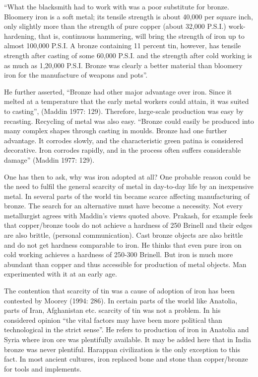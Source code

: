 {\footnotesize “What the blacksmith had to work with was a poor substitute for bronze. Bloomery iron is a soft metal; its tensile strength is about 40,000 per square inch, only slightly more than the strength of pure copper (about 32,000 P.S.I.) work-hardening, that is, continuous hammering, will bring the strength of iron up to almost 100,000 P.S.I. A bronze containing 11 percent tin, however, has tensile strength after casting of some 60,000 P.S.I. and the strength after cold working is as much as 1,20,000 P.S.I. Bronze was clearly a better material than bloomery iron for the manufacture of weapons and pots”.}

He further asserted, “Bronze had other major advantage over iron. Since it melted at a temperature that the early metal workers could attain, it was suited to casting”, (Maddin 1977: 129). Therefore, large-scale production was easy by recasting. Recycling of metal was also easy. {\footnotesize “Bronze could easily be produced into many complex shapes through casting in moulds. Bronze had one further advantage. It corrodes slowly, and the characteristic green patina is considered decorative. Iron corrodes rapidly, and in the process often suffers considerable damage”} (Maddin 1977: 129). 

One has then to ask, why was iron adopted at all? One probable reason could be the need to fulfil the general scarcity of metal in day-to-day life by an inexpensive metal. In several parts of the world tin became scarce affecting manufacturing of bronze. The search for an alternative must have become a necessity. Not every metallurgist agrees with Maddin's views quoted above. Prakash, for example feels that copper/bronze tools do not achieve a hardness of 250 Brinell and their edges are also brittle, (personal communication). Cast bronze objects are also brittle and do not get hardness comparable to iron. He thinks that even pure iron on cold working achieves a hardness of 250-300 Brinell. But iron is much more abundant than copper and thus accessible for production of metal objects. Man experimented with it at an early age.

The contention that scarcity of tin was a cause of adoption of iron has been contested by Moorey (1994: 286). In certain parts of the world like Anatolia, parts of Iran, Afghanistan etc. scarcity of tin was not a problem. In his considered opinion “the vital factors may have been more political than technological in the strict sense”. He refers to production of iron in Anatolia and Syria where iron ore was plentifully available. It may be added here that in India bronze was never plentiful. Harappan civilization is the only exception to this fact. In most ancient cultures, iron replaced bone and stone than copper/bronze for tools and implements.

